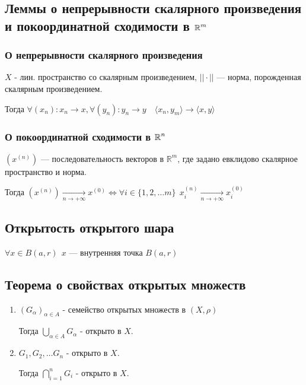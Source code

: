 \subsection{Леммы о непрерывности скалярного произведения и покоординатной сходимости в $\operatorname*{\mathbb{R}}^m$}

\subsubsection{О непрерывности скалярного произведения}

$X$ - лин. пространство со скалярным произведением, $||\cdot||$ --- норма, порожденная скалярным произведением.

Тогда $\forall (x_n) : x_n\to x, \forall (y_n) : y_n\to y \quad \langle x_n,y_m\rangle\to\langle x,y\rangle$

\subsubsection{О покоординатной сходимости в $\operatorname*{\mathbb{R}}^n$}

$(x^{(n)})$ --- последовательность векторов в $\mathbb{R}^m$, где задано евклидово скалярное пространство и норма.

Тогда $(x^{(n)})\underset{n\to+\infty}\to x^{(0)} \Leftrightarrow \forall i\in\{1,2,\ldots m\} \ \ x_i^{(n)}\underset{n\to+\infty}\to x_i^{(0)}$

\subsection{Открытость открытого шара}

$\forall x \in B(a, r) \ \ x$ --- внутренняя точка $B(a, r)$

\subsection{Теорема о свойствах открытых множеств}

\begin{enumerate}
    \item $(G_\alpha)_{\alpha\in A}$ - семейство открытых множеств в $(X,\rho)$
    
    Тогда $\bigcup\limits_{\alpha\in A} G_\alpha$ - открыто в $X$.

    \item $G_1,G_2,\ldots G_n$ - открыто в $X$.
    
    Тогда $\bigcap\limits_{i=1}^{n} G_i$ - открыто в $X$.
\end{enumerate}

